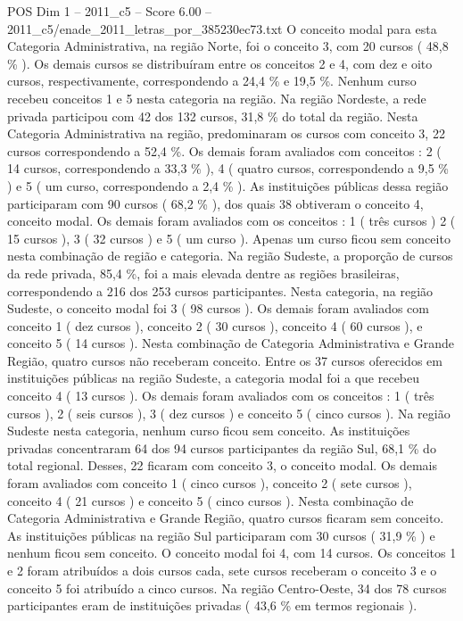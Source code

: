 \begin{textsample}{POS Dim 1 – 2011\_c5 – Score 6.00 – 2011\_c5/enade\_2011\_letras\_por\_385230ec73.txt}
O conceito modal para esta Categoria Administrativa, na região Norte, foi o conceito 3, com 20 cursos ( 48,8 \% ).
Os demais cursos se distribuíram entre os conceitos 2 e 4, com dez e oito cursos, respectivamente, correspondendo a 24,4 \% e 19,5 \%.
Nenhum curso recebeu conceitos 1 e 5 nesta categoria na região.
Na região Nordeste, a rede privada participou com 42 dos 132 cursos, 31,8 \% do total da região.
Nesta Categoria Administrativa na região, predominaram os cursos com conceito 3, 22 cursos correspondendo a 52,4 \%.
Os demais foram avaliados com conceitos : 2 ( 14 cursos, correspondendo a 33,3 \% ), 4 ( quatro cursos, correspondendo a 9,5 \% ) e 5 ( um curso, correspondendo a 2,4 \% ).
As instituições públicas dessa região participaram com 90 cursos ( 68,2 \% ), dos quais 38 obtiveram o conceito 4, conceito modal.
Os demais foram avaliados com os conceitos : 1 ( três cursos ) 2 ( 15 cursos ), 3 ( 32 cursos ) e 5 ( um curso ).
Apenas um curso ficou sem conceito nesta combinação de região e categoria.
Na região Sudeste, a proporção de cursos da rede privada, 85,4 \%, foi a mais elevada dentre as regiões brasileiras, correspondendo a 216 dos 253 cursos participantes.
Nesta categoria, na região Sudeste, o conceito modal foi 3 ( 98 cursos ).
Os demais foram avaliados com conceito 1 ( dez cursos ), conceito 2 ( 30 cursos ), conceito 4 ( 60 cursos ), e conceito 5 ( 14 cursos ).
Nesta combinação de Categoria Administrativa e Grande Região, quatro cursos não receberam conceito.
Entre os 37 cursos oferecidos em instituições públicas na região Sudeste, a categoria modal foi a que recebeu conceito 4 ( 13 cursos ).
Os demais foram avaliados com os conceitos : 1 ( três cursos ), 2 ( seis cursos ), 3 ( dez cursos ) e conceito 5 ( cinco cursos ).
Na região Sudeste nesta categoria, nenhum curso ficou sem conceito.
As instituições privadas concentraram 64 dos 94 cursos participantes da região Sul, 68,1 \% do total regional.
Desses, 22 ficaram com conceito 3, o conceito modal.
Os demais foram avaliados com conceito 1 ( cinco cursos ), conceito 2 ( sete cursos ), conceito 4 ( 21 cursos ) e conceito 5 ( cinco cursos ).
Nesta combinação de Categoria Administrativa e Grande Região, quatro cursos ficaram sem conceito.
As instituições públicas na região Sul participaram com 30 cursos ( 31,9 \% ) e nenhum ficou sem conceito.
O conceito modal foi 4, com 14 cursos.
Os conceitos 1 e 2 foram atribuídos a dois cursos cada, sete cursos receberam o conceito 3 e o conceito 5 foi atribuído a cinco cursos.
Na região Centro-Oeste, 34 dos 78 cursos participantes eram de instituições privadas ( 43,6 \% em termos regionais ).

\end{textsample}
